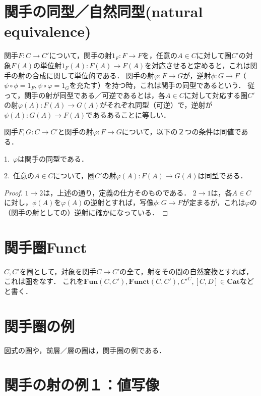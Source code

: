 \documentclass[uplatex, 12pt, dvipdfmx]{jsreport}
\begin{document}
\section{関手の同型／自然同型(natural equivalence)}
関手$F:C\to C'$について，関手の射$1_F:F\to F$を，任意の$A\in C$に対して圏$C'$の対象$F(A)$の単位射$1_F(A):F(A)\to F(A)$を対応させると定めると，これは関手の射の合成に関して単位的である．
関手の射$\varphi :F\rightarrow G$が，逆射$\phi :G\rightarrow F$（$\psi\circ\phi =1_F, \psi\circ\varphi =1_G$を充たす）を持つ時，これは関手の同型であるという．
従って，関手の射が同型である／可逆であるとは，各$A\in C$に対して対応する圏$C'$の射$\varphi (A):F(A)\rightarrow G(A)$がそれぞれ同型（可逆）で，逆射が$\psi (A):G(A)\to F(A)$であるあることに等しい．

\begin{proposition}[関手の同型の特徴付け]\label{prop-charactorization-natural-equavalence}
    関手$F,G:C\to C'$と関手の射$\varphi :F\to G$について，以下の２つの条件は同値である．\rm{}

    1.\, $\varphi$は関手の同型である．

    2.\, 任意の$A\in C$について，圏$C'$の射$\varphi (A):F(A)\to G(A)$は同型である．
\end{proposition}
\begin{proof}
    $1\to 2$は，上述の通り，定義の仕方そのものである．
    $2\to 1$は，各$A\in C$に対し，$\phi (A)$を$\varphi (A)$の逆射とすれば，写像$\phi :G\to F$が定まるが，これは$\varphi$の（関手の射としての）逆射に確かになっている．
\end{proof}

\section{関手圏\textrm{Funct}}
$C,C'$を圏として，対象を関手$C\rightarrow C'$の全て，射をその間の自然変換とすれば，これは圏をなす．
これを$\mathbf{Fun}(C,C'),\mathbf{Funct}(C,C'), {C'}^{C}, [C,D]\in \mathbf{Cat}$などと書く．

\section{関手圏の例}
図式の圏や，前層／層の圏は，関手圏の例である．

\section{関手の射の例１：値写像}\label{section-vectorspace-1}
\end{document}
